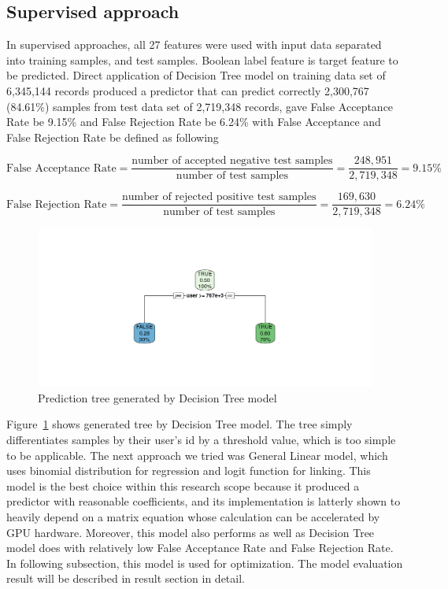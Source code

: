 \documentclass[English]{dicomopapers}
\begin{document}
\subsection{Supervised approach}
 In supervised approaches, all 27 features were used with input data separated into training samples, and test samples. Boolean label feature is target feature to be predicted.\newline
Direct application of Decision Tree model on training data set of 6,345,144 records produced a predictor that can predict correctly 2,300,767 (84.61\%) samples from test data set of 2,719,348 records, gave False Acceptance Rate be 9.15\% and False Rejection Rate be 6.24\% with False Acceptance and False Rejection Rate be defined as following
\begin{center}
  \[ \text{False Acceptance Rate} = \frac{\text{number of accepted negative test samples}}{\text{number of test samples}} = \frac{248,951}{2,719,348}=9.15\% \]
\end{center}
\begin{center}
  \[ \text{False Rejection Rate} = \frac{\text{number of rejected positive test samples}}{\text{number of test samples}} = \frac{169,630}{2,719,348}=6.24\% \]
\end{center}
\begin{figure}[ht]
  \centering
  \includegraphics[width=\textwidth/3,natwidth=1024,natheight=485]{dtree.png}
  \caption{Prediction tree generated by Decision Tree model}\label{fig:dtree}
\end{figure}
Figure~\ref{fig:dtree} shows generated tree by Decision Tree model. The tree simply differentiates samples by their user's id by a threshold value, which is too simple to be applicable.\newline
	The next approach we tried was General Linear model, which uses binomial distribution for regression and logit function for linking. This model is the best choice within this research scope because it produced a predictor with reasonable coefficients, and its implementation is latterly shown to heavily depend on a matrix equation whose calculation can be accelerated by GPU hardware. Moreover, this model also performs as well as Decision Tree model does with relatively low False Acceptance Rate and False Rejection Rate. In following subsection, this model is used for optimization. The model evaluation result will be described in result section in detail.
\end{document}
